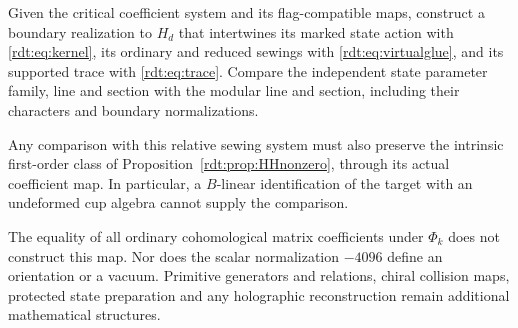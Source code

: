 \begin{question}\label{rdt:qn:realization}
Given the critical coefficient system and its flag-compatible maps,
construct a boundary realization to $H_d$ that intertwines its marked
state action with \eqref{rdt:eq:kernel}, its ordinary and reduced
sewings with \eqref{rdt:eq:virtualglue}, and its supported trace with
\eqref{rdt:eq:trace}. Compare the independent state parameter family,
line and section with the modular line and section, including their
characters and boundary normalizations.
\end{question}

Any comparison with this relative sewing system must also preserve
the intrinsic first-order class of
Proposition~\ref{rdt:prop:HHnonzero}, through its actual coefficient
map. In particular, a $B$-linear identification of the target with
an undeformed cup algebra cannot supply the comparison.

The equality of all ordinary cohomological matrix coefficients under
$\Phi_k$ does not construct this map. Nor does the scalar normalization
$-4096$ define an orientation or a vacuum. Primitive generators and
relations, chiral collision maps, protected state preparation and any
holographic reconstruction remain additional mathematical structures.
